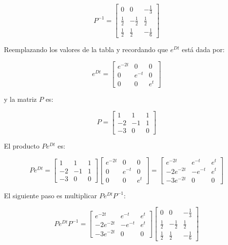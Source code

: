 \begin{enumerate}
\[
P^{-1} = 
\begin{bmatrix}
0 & 0 & -\frac{1}{3} \\
\frac{1}{2} & -\frac{1}{2} & \frac{1}{2} \\
\frac{1}{2} & \frac{1}{2} & -\frac{1}{6}
\end{bmatrix}
\]

Reemplazando los valores de la tabla y recordando que $e^{Dt}$ está dada por:

\[
e^{Dt} = 
\begin{bmatrix}
e^{-2t} & 0 & 0 \\
0 & e^{-t} & 0 \\
0 & 0 & e^{t}
\end{bmatrix}
\]

y la matriz $P$ es:

\[
P = 
\begin{bmatrix}
1 & 1 & 1 \\
-2 & -1 & 1 \\
-3 & 0 & 0
\end{bmatrix}
\]

El producto \( P e^{Dt} \) es:

\[
P e^{Dt} =
\begin{bmatrix}
1 & 1 & 1 \\
-2 & -1 & 1 \\
-3 & 0 & 0
\end{bmatrix}
\begin{bmatrix}
e^{-2t} & 0 & 0 \\
0 & e^{-t} & 0 \\
0 & 0 & e^{t}
\end{bmatrix}
=
\begin{bmatrix}
e^{-2t} & e^{-t} & e^{t} \\
-2e^{-2t} & -e^{-t} & e^{t} \\
-3e^{-2t} & 0 & 0
\end{bmatrix}
\]

El siguiente paso es multiplicar \( P e^{Dt} P^{-1} \):

\[
P e^{Dt} P^{-1} =
\begin{bmatrix}
e^{-2t} & e^{-t} & e^{t} \\
-2e^{-2t} & -e^{-t} & e^{t} \\
-3e^{-2t} & 0 & 0
\end{bmatrix}
\begin{bmatrix}
0 & 0 & -\frac{1}{3} \\
\frac{1}{2} & -\frac{1}{2} & \frac{1}{2} \\
\frac{1}{2} & \frac{1}{2} & -\frac{1}{6}
\end{bmatrix}
\]


\end{enumerate}
